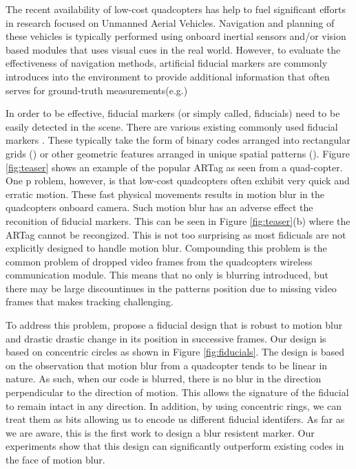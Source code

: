 \documentclass[runningheads]{llncs}
\begin{document}
The recent availability of low-cost quadcopters has help to fuel significant efforts in
research focused on Unmanned Aerial Vehicles.  Navigation and planning of
these vehicles is typically performed using onboard inertial sensors and/or
vision based modules that uses visual cues in the real world\cite{Davison:2007}. 
However, to evaluate the effectiveness of navigation methods, artificial
fiducial markers are commonly introduces into the environment to provide
additional information that often serves for ground-truth
measurements(e.g.\cite{Bosnak:2012}\cite{Lim09})

In order to be effective, fiducial markers (or simply called, fiducials) need
to be easily detected in the scene.  There are various existing commonly
used fiducial markers 
\cite{NaimarkF02}\cite{ARToolkit02}\cite{Fiala05}\cite{Pitag13}\cite{runetag11}.
These typically take the form of binary codes arranged into rectangular grids (\cite{ARToolkit02}\cite{Fiala05})
or other geometric features arranged in unique spatial patterns
(\cite{NaimarkF02}\cite{Pitag13}\cite{runetag11}).
Figure \ref{fig:teaser} shows an example of the popular ARTag\cite{Fiala05} as
seen from a quad-copter.  One p roblem, however, is that low-cost quadcopters
often exhibit very quick and erratic motion.  These fast physical movements
results in motion blur in the quadcopters onboard camera.  Such motion blur has an adverse effect the
reconition of fiducial  markers.  This can be seen in Figure \ref{fig:teaser}(b)
where the ARTag cannot be recongized. This is not too surprising as most
fidicuals are not explicitly designed to handle motion blur.  Compounding this
problem is the common problem of dropped video frames from the quadcopters
wireless communication module.   This means that no only is blurring
introduced, but there may be large discountinues in the patterns position due
to missing video frames that makes tracking challenging.

To address this problem, propose a fiducial design that is robust to motion
blur and drastic drastic change in its position in successive frames.  Our
design is based on concentric circles as shown in Figure \ref{fig:fiducials}. 
The design is based on the observation that motion blur from a quadcopter tends
to be linear in nature.  As such, when our code is blurred, there is no blur in
the direction perpendicular to the direction of motion.   This allows the
signature of the fiducial to remain intact in any direction.  In addition, by
using concentric rings, we can treat them as bits allowing us to encode us
different fiducial identifers.  As far as we are aware, this is the first work
to design a blur resistent marker.   Our experiments show that this design can
significantly outperform existing codes in the face of motion blur.
\end{document}
